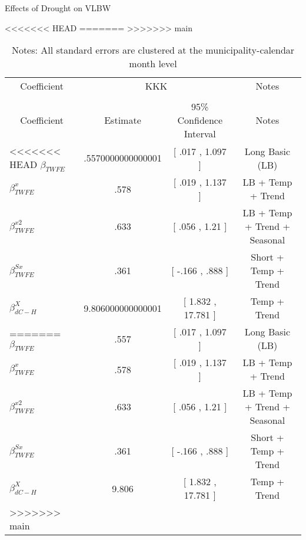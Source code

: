 \begin{table}[!ht]
\centering
\caption{Effects of Drought on VLBW}\label{tab:twfe_vlbw_test}
<<<<<<< HEAD
\renewcommand{\arraystretch}{1.5}
=======
>>>>>>> main
\fontsize{10pt}{12pt}\selectfont
\begin{tabular}{lccc}
\toprule

 \multicolumn{1}{c}{Coefficient} &\multicolumn{2}{c}{KKK}&\multicolumn{1}{c}{Notes}\\\cmidrule(lr){2-3}\cmidrule(lr){4-4} \\
 
 \multicolumn{1}{c}{Coefficient}  &\multicolumn{1}{c}{Estimate}&\multicolumn{1}{c}{95\% Confidence Interval}&\multicolumn{1}{c}{Notes} \\
 
\midrule
<<<<<<< HEAD
 $ \beta_{TWFE} $ & .5570000000000001  & [ .017 ,  1.097 ] & Long Basic (LB) \\
 $ \beta^{x}_{TWFE} $ & .578  &  [ .019 ,  1.137  ] & LB + Temp + Trend \\
 $ \beta^{x2}_{TWFE} $ & .633  & [ .056 ,  1.21  ] & LB + Temp + Trend + Seasonal \\
 $ \beta^{Sx}_{TWFE} $ & .361  & [ -.166 ,  .888  ] & Short + Temp + Trend \\
 $ \beta^{X}_{dC-H} $ & 9.806000000000001  & [ 1.832 ,  17.781 ] & Temp + Trend \\
=======
 $ \beta_{TWFE} $ & .557  & [ .017 ,  1.097 ] & Long Basic (LB) \\
 \addlinespace
 $ \beta^{x}_{TWFE} $ & .578  &  [ .019 ,  1.137  ] & LB + Temp + Trend \\
 $ \beta^{x2}_{TWFE} $ & .633  & [ .056 ,  1.21  ] & LB + Temp + Trend + Seasonal \\
 $ \beta^{Sx}_{TWFE} $ & .361  & [ -.166 ,  .888  ] & Short + Temp + Trend \\
 $ \beta^{X}_{dC-H} $ & 9.806  & [ 1.832 ,  17.781 ] & Temp + Trend \\
>>>>>>> main
\bottomrule
\end{tabular}
\caption*{\footnotesize{Notes: All standard errors are clustered at the municipality-calendar month level}}
\end{table}
